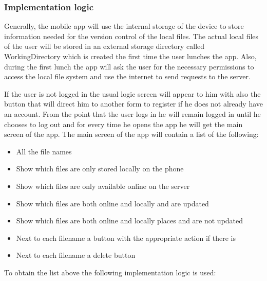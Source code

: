 \documentclass[11pt]{article}
\begin{document}
\subsubsection*{Implementation logic}

Generally, the mobile app will use the internal storage of the device to store information needed for the version control of the local files. The actual local files of the user will be stored in an external storage directory called WorkingDirectory which is created the first time the user lunches the app. Also, during the first lunch the app will ask the user for the necessary permissions to access the local file system and use the internet to send requests to the server.

If the user is not logged in the usual logic screen will appear to him with also the button that will direct him to another form to register if he does not already have an account. From the point that the user logs in he will remain logged in until he chooses to log out and for every time he opens the app he will get the main screen of the app. The main screen of the app will contain a list of the following:

\begin{itemize}
	\item{All the file names}
	\item{Show which files are only stored locally on the phone}
	\item{Show which files are only available online on the server}
	\item{Show which files are both online and locally and are updated}
	\item{Show which files are both online and locally places and are not updated}
	\item{Next to each filename a button with the appropriate action if there is}
	\item{Next to each filename a delete button}
\end{itemize}

To obtain the list above the following implementation logic is used:
\end{document}
